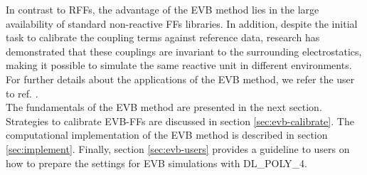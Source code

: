 In contrast to RFFs, the advantage of the EVB method lies in the large availability of standard non-reactive FFs libraries. In addition, despite the initial task to calibrate the coupling terms against reference data, research has demonstrated that these couplings are invariant to the surrounding electrostatics, making it possible to simulate the same reactive unit in different environments. For further details about the applications of the EVB method, we refer the user to ref. \cite{scivetti-evb}.\\
The fundamentals of the EVB method are presented in the next section. Strategies to calibrate EVB-FFs are discussed in section \ref{sec:evb-calibrate}. The computational implementation of the EVB method is described in section \ref{sec:implement}. Finally, section \ref{sec:evb-users} provides a guideline to users on how to prepare the settings for EVB simulations with DL\_POLY\_4.   

